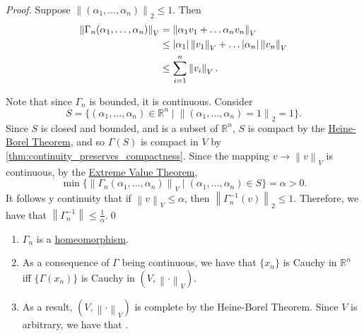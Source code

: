 \documentclass[notoc,notitlepage]{tufte-book}
\newcommand{\norm}[1]{\left\| #1 \right\|}
\begin{document}
\begin{proof}
   Suppose $\norm{ (\alpha_1, \ldots, \alpha_n) }_2 \leq 1$. Then
  \begin{align*}
    \norm{ \Gamma_n(\alpha_1, \ldots, \alpha_n) }_V &= \norm{ \alpha_1 v_1 + \hdots \alpha_n v_n }_V \\
                                                    &\leq \abs{ \alpha_1 } \norm{v_1}_V + \hdots \abs{ \alpha_n } \norm{v_n}_V \\
                                                    &\leq \sum_{i=1}^{n} \norm{ v_i }_V.
  \end{align*}

  \noindent
   Note that since $\Gamma_n$ is bounded, it is continuous. Consider
  \begin{equation*}
    S = \{ (\alpha_1, \ldots, \alpha_n) \in \mathbb{R}^n \mid \norm{ (\alpha_1, \ldots, \alpha_n) = 1 }_2 = 1 \}.
  \end{equation*}
  Since $S$ is closed and bounded, and is a subset of $\mathbb{R}^n$, $S$ is compact by the \hyperref[thm:heine_borel_theorem]{Heine-Borel Theorem}, and so $\Gamma(S)$ is compact in $V$ by \cref{thm:continuity_preserves_compactness}. Since the mapping $v \to \norm{v}_V$ is continuous, by the \hyperref[crly:extreme_value_theorem]{Extreme Value Theorem},
  \begin{equation*}
    \min \{ \norm{ \Gamma_n(\alpha_1, \ldots, \alpha_n) }_V \mid (\alpha_1, \ldots, \alpha_n) \in S \} = \alpha > 0.
  \end{equation*}
It follows y continuity that if $\norm{v}_V \leq \alpha$, then $\norm{\Gamma_n^{-1}(v)}_2 \leq 1$. Therefore, we have that $\norm{\Gamma_n^{-1}} \leq \frac{1}{\alpha}$.\qed\
\end{proof}

\begin{note}
  \begin{enumerate}
    \item $\Gamma_n$ is a \hyperref[defn:homeomorphism]{homeomorphism}.
    \item As a consequence of $\Gamma$ being continuous, we have that $\{ x_n \}$ is Cauchy in $\mathbb{R}^n$ iff $\{ \Gamma(x_n) \}$ is Cauchy in $(V, \norm\cdot_V)$.
    \item As a result, $(V, \norm\cdot_V)$ is complete by the Heine-Borel Theorem. Since $V$ is arbitrary, we have that .
  \end{enumerate}
\end{note}
\end{document}

